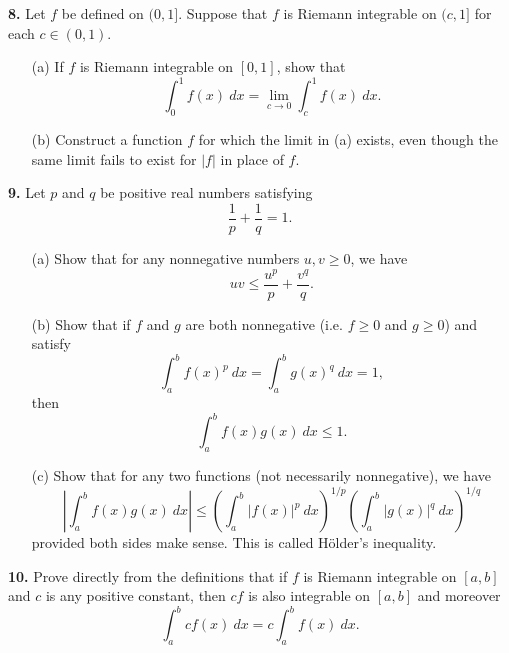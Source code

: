 \documentclass[12pt]{article}
\begin{document}
\medskip

\noindent \textbf{8.} Let $f$ be defined on $(0,1]$. Suppose that $f$ is Riemann integrable on $(c,1]$ for each $c \in (0,1)$. 
\begin{enumerate}
\item[(a)] If $f$ is Riemann integrable on $[0,1]$, show that 
\[
\int_0^1 f(x)\: dx = \lim_{c \to 0}\int_c^1 f(x)\:dx.
\]
\item[(b)] Construct a function $f$ for which the limit in (a) exists, even though the same limit fails to exist for $|f|$ in place of $f$. 
\end{enumerate} 

\medskip

\noindent \textbf{9.} Let $p$ and $q$ be positive real numbers satisfying 
\[
\frac{1}{p} + \frac{1}{q} = 1.
\]
\begin{enumerate}
\item[(a)] Show that for any nonnegative numbers $u,v \geqslant 0$, we have 
\[
uv \leqslant \frac{u^p}{p} + \frac{v^q}{q}.
\]
\item[(b)] Show that if $f$ and $g$ are both nonnegative (i.e. $f \geqslant 0$ and $g \geqslant 0$) and satisfy 
\[
\int_a^b f(x)^p\: dx = \int_a^b g(x)^q \: dx = 1,
\]
then 
\[
\int_a^b f(x)g(x) \: dx \leqslant 1.
\]
\item[(c)] Show that for any two functions (not necessarily nonnegative), we have 
\[
\left|\int_a^b f(x)g(x) \: dx\right| \leqslant \left(\int_a^b |f(x)|^p\: dx\right)^{1/p}\left(\int_a^b |g(x)|^q\: dx\right)^{1/q}
\]
provided both sides make sense. This is called H\"older's inequality. 
\end{enumerate}

\medskip

\noindent \textbf{10.} Prove directly from the definitions that if $f$ is Riemann integrable on $[a,b]$ and $c$ is any positive constant, then $cf$ is also integrable on $[a,b]$ and moreover
\[
\int_a^b cf(x) \: dx = c \int_a^b f(x)\: dx.
\] 
\end{document}

